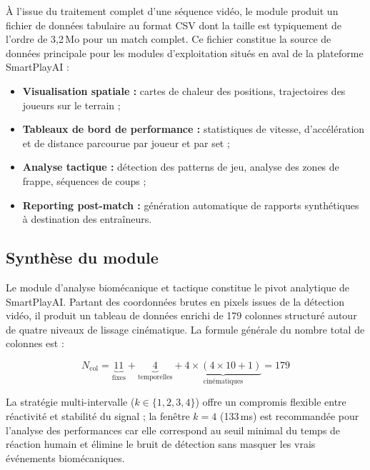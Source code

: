 À l'issue du traitement complet d'une séquence vidéo, le module produit un fichier de données
tabulaire au format CSV dont la taille est typiquement de l'ordre de 3,2\,Mo pour un match
complet. Ce fichier constitue la source de données principale pour les modules d'exploitation
situés en aval de la plateforme SmartPlayAI :

\begin{itemize}[leftmargin=1.5em]
  \item \textbf{Visualisation spatiale :} cartes de chaleur des positions, trajectoires des
        joueurs sur le terrain ;
  \item \textbf{Tableaux de bord de performance :} statistiques de vitesse, d'accélération
        et de distance parcourue par joueur et par set ;
  \item \textbf{Analyse tactique :} détection des patterns de jeu, analyse des zones de
        frappe, séquences de coups ;
  \item \textbf{Reporting post-match :} génération automatique de rapports synthétiques à
        destination des entraîneurs.
\end{itemize}

\subsection{Synthèse du module}

Le module d'analyse biomécanique et tactique constitue le pivot analytique de SmartPlayAI.
Partant des coordonnées brutes en pixels issues de la détection vidéo, il produit un tableau
de données enrichi de 179 colonnes structuré autour de quatre niveaux de lissage cinématique.
La formule générale du nombre total de colonnes est :

\begin{equation}
  N_{\mathrm{col}} = \underbrace{11}_{\text{fixes}} + \underbrace{4}_{\text{temporelles}}
  + \underbrace{4 \times (4 \times 10 + 1)}_{\text{cinématiques}} = 179
  \label{eq:nb_colonnes}
\end{equation}

La stratégie multi-intervalle ($k \in \{1, 2, 3, 4\}$) offre un compromis flexible entre
réactivité et stabilité du signal ; la fenêtre $k = 4$ (133\,ms) est recommandée pour
l'analyse des performances car elle correspond au seuil minimal du temps de réaction humain
et élimine le bruit de détection sans masquer les vrais événements biomécaniques.

